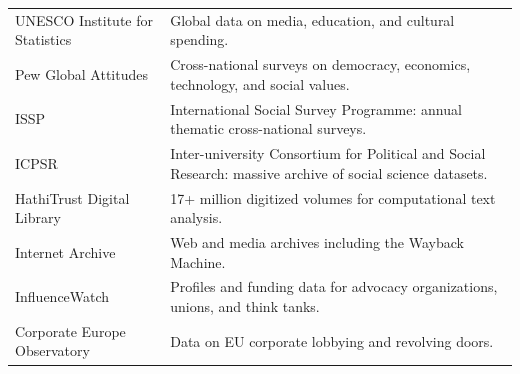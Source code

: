 \begin{longtable}{p{4cm} p{9.5cm}}
UNESCO Institute for Statistics & Global data on media, education, and cultural spending. \\

Pew Global Attitudes & Cross-national surveys on democracy, economics, technology, and social values. \\

ISSP & International Social Survey Programme: annual thematic cross-national surveys. \\

ICPSR & Inter-university Consortium for Political and Social Research: massive archive of social science datasets. \\

HathiTrust Digital Library & 17+ million digitized volumes for computational text analysis. \\

Internet Archive & Web and media archives including the Wayback Machine. \\

InfluenceWatch & Profiles and funding data for advocacy organizations, unions, and think tanks. \\

Corporate Europe Observatory & Data on EU corporate lobbying and revolving doors. \\

\bottomrule
\end{longtable}
